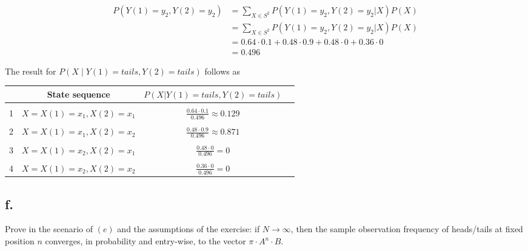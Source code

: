 \documentclass[a4paper, 12pt, titlepage]{article}
\begin{document}
\begin{align}
  P(Y(1)=y_2,Y(2)=y_2) &= \sum_{X \in S^2} P(Y(1)=y_2,Y(2)=y_2|X) P(X)  \\
	     &= \sum_{X \in S^2} P(Y(1)=y_2,Y(2)=y_2|X) P(X) \\
	     &= 0.64\cdot 0.1 + 0.48\cdot 0.9 + 0.48 \cdot 0 + 0.36\cdot 0 \\
	     &= 0.496
\end{align}

The result for $P(X \mid Y(1)=tails,Y(2)=tails)$ follows as

\begin{tabular}{l*{2}{c}r}
              & State sequence &  $P(X|Y(1)=tails,Y(2)=tails)$ & \\
\hline
& & & \\
1 & $X=X(1)=x_1,X(2)=x_1$ & $\frac{0.64 \cdot 0.1}{0.496} \approx 0.129$ \\
& & & \\
2 & $X=X(1)=x_1,X(2)=x_2$ & $\frac{0.48 \cdot 0.9}{0.496} \approx 0.871$ \\
& & & \\
3 & $X=X(1)=x_2,X(2)=x_1$ & $\frac{0.48\cdot 0}{0.496} = 0$ \\
& & & \\
4 & $X=X(1)=x_2,X(2)=x_2$ & $\frac{0.36 \cdot 0}{0.496} = 0$ 
 \end{tabular}

 
\subsection*{f.}
Prove in the scenario of $(e)$ and the assumptions of the exercise: if $N \rightarrow \infty$, then the sample observation frequency of heads/tails at fixed position $n$ converges, in probability and entry-wise, to the vector $\pi \cdot A^n \cdot B$.
\end{document}
